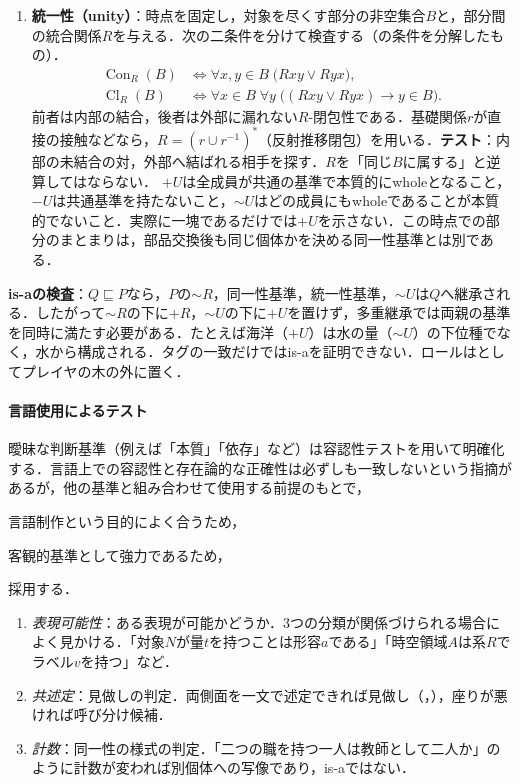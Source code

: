 \documentclass[../../main-detail.tex]{subfiles}
\begin{document}
\begin{enumerate}
    \item \textbf{統一性（unity）}：時点を固定し，対象を尽くす部分の非空集合$B$と，部分間の統合関係$R$を与える．次の二条件を分けて検査する（\citet[定義3--4]{guarino2000identityunity}の条件を分解したもの）．
    \[
    \begin{aligned}
        \operatorname{Con}_R(B)&\iff\forall x,y\in B\;\bigl(Rxy\lor Ryx\bigr),\\
        \operatorname{Cl}_R(B)&\iff\forall x\in B\;\forall y\;\bigl((Rxy\lor Ryx)\to y\in B\bigr).
    \end{aligned}
    \]
    前者は内部の結合，後者は外部に漏れない$R$-閉包性である．基礎関係$r$が直接の接触などなら，$R=(r\cup r^{-1})^*$（反射推移閉包）を用いる．\textbf{テスト}：内部の未結合の対，外部へ結ばれる相手を探す．$R$を「同じ$B$に属する」と逆算してはならない．
    $+U$は全成員が共通の基準で本質的にwholeとなること，$-U$は共通基準を持たないこと，${\sim}U$はどの成員にもwholeであることが本質的でないこと．実際に一塊であるだけでは$+U$を示さない．この時点での部分のまとまりは，部品交換後も同じ個体かを決める同一性基準とは別である．
\end{enumerate}

\noindent\textbf{is-aの検査}：$Q\sqsubseteq P$なら，$P$の${\sim}R$，同一性基準，統一性基準，${\sim}U$は$Q$へ継承される．したがって${\sim}R$の下に$+R$，${\sim}U$の下に$+U$を置けず，多重継承では両親の基準を同時に満たす必要がある．たとえば海洋（$+U$）は水の量（${\sim}U$）の下位種でなく，水から構成される．タグの一致だけではis-aを証明できない．ロールはとしてプレイヤの木の外に置く．

\paragraph{言語使用によるテスト} 曖昧な判断基準（例えば「本質」「依存」など）は容認性テストを用いて明確化する．言語上での容認性と存在論的な正確性は必ずしも一致しないという指摘があるが，他の基準と組み合わせて使用する前提のもとで，
\begin{enumerate*}
    \item 言語制作という目的によく合うため，
    \item 客観的基準として強力であるため，
\end{enumerate*}
採用する．
\begin{enumerate}
    \item \emph{表現可能性}：ある表現が可能かどうか．3つの分類が関係づけられる場合によく見かける．「対象$N$が量$t$を持つことは形容$a$である」「時空領域$A$は系$R$でラベル$v$を持つ」など．
    \item \emph{共述定}：見做しの判定．両側面を一文で述定できれば見做し（，），座りが悪ければ呼び分け候補．
    \item \emph{計数}：同一性の様式の判定．「二つの職を持つ一人は教師として二人か」のように計数が変われば別個体への写像であり，is-aではない．
\end{enumerate}
\end{document}

